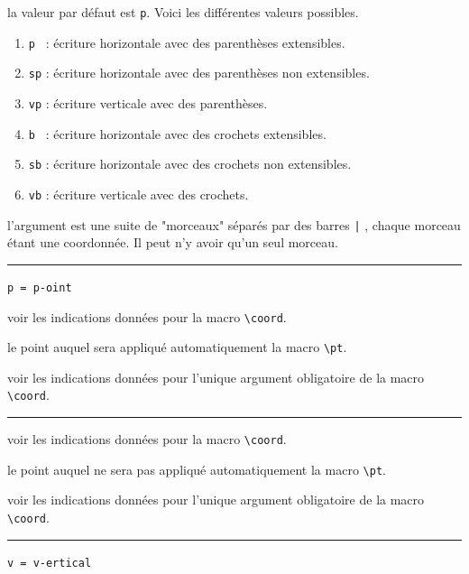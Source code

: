 \documentclass[12pt,a4paper]{book}
\newcommand\env[1]{\texttt{#1}}
\newcommand\macro[1]{\env{\textbackslash{}#1}}
\theoremstyle{definition}
\newcommand\separation{
	\medskip
	\hfill\rule{0.5\textwidth}{0.75pt}\hfill
	\medskip
}
\newcommand\mwhyprefix[2]{%
	\texttt{#1 = #1-#2}%
}
\begin{document}
{{\label{tnsgeo-coordinates-tech}



\IDoption{} la valeur par défaut est \verb+p+. Voici les différentes valeurs possibles.
\begin{enumerate}
	\item \verb+p + : écriture horizontale avec des parenthèses extensibles.

	\item \verb+sp+ : écriture horizontale avec des parenthèses non extensibles.

	\item \verb+vp+ : écriture verticale avec des parenthèses.

	\item \verb+b + : écriture horizontale avec des crochets extensibles.

	\item \verb+sb+ : écriture horizontale avec des crochets non extensibles.

	\item \verb+vb+ : écriture verticale avec des crochets.
\end{enumerate}


\IDarg{} l'argument est une suite de "morceaux" séparés par des barres \verb+|+ , chaque morceau étant une coordonnée. Il peut n'y avoir qu'un seul morceau.


\separation


  \hfill \mwhyprefix{p}{oint}

\IDoption{} voir les indications données pour la macro \macro{coord}.

 le point auquel sera appliqué automatiquement la macro \macro{pt}.

 voir les indications données pour l'unique argument obligatoire de la macro \macro{coord}.


\separation



\IDoption{} voir les indications données pour la macro \macro{coord}.

 le point auquel ne sera pas appliqué automatiquement la macro \macro{pt}.

 voir les indications données pour l'unique argument obligatoire de la macro \macro{coord}.


\separation


 \hfill \mwhyprefix{v}{ertical}

}}
\end{document}
